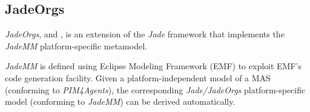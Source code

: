 \subsection{JadeOrgs}

\textit{JadeOrgs}, \cite{Madrigal-Mora08} and \cite{Madrigal-Mora09}, is an extension of the \textit{Jade} framework that implements the \textit{JadeMM} platform-specific metamodel.

\textit{JadeMM} is defined using Eclipse Modeling Framework (EMF) to exploit EMF's code generation facility.
Given a platform-independent model of a MAS (conforming to \textit{PIM4Agents}), the corresponding \textit{Jade/JadeOrgs} platform-specific model (conforming to \textit{JadeMM}) can be derived automatically.